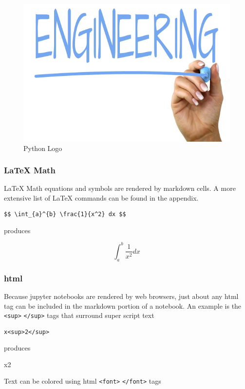 \documentclass{book}
\makeatletter
\def\maxwidth{\ifdim\Gin@nat@width>\linewidth\linewidth
    \else\Gin@nat@width\fi}
\let\Oldincludegraphics\includegraphics
\renewcommand{\includegraphics}[1]{\Oldincludegraphics[width=.8\maxwidth]{#1}}
\makeatother
\begin{document}
\begin{figure}
\centering
\includegraphics{images/engineering.png}
\caption{Python Logo}
\end{figure}

\subsubsection{LaTeX Math}\label{latex-math}

LaTeX Math equations and symbols are rendered by markdown cells. A more
extensive list of LaTeX commands can be found in the appendix.

\begin{lstlisting}
$$ \int_{a}^{b} \frac{1}{x^2} dx $$
\end{lstlisting}

produces

\[ \int_{a}^{b} \frac{1}{x^2} dx \]

\subsubsection{html}\label{html}

Because jupyter notebooks are rendered by web browsers, just about any
html tag can be included in the markdown portion of a notebook. An
example is the \lstinline!<sup>! \lstinline!</sup>! tags that surround
super script text

\begin{lstlisting}
x<sup>2</sup>
\end{lstlisting}

produces

x2

Text can be colored using html \lstinline!<font>! \lstinline!</font>!
tags
\end{document}
